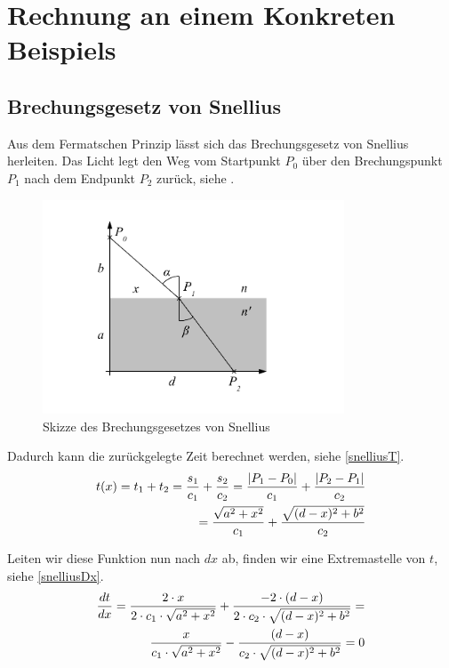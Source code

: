 \section{Rechnung an einem Konkreten Beispiels}

\subsection{Brechungsgesetz von Snellius \label{brechungsgesetz}}
\cite{Wikipedia} Aus dem Fermatschen Prinzip lässt sich das Brechungsgesetz von Snellius herleiten.
Das Licht legt den Weg vom Startpunkt $P_0$ über den Brechungspunkt $P_1$ 
nach dem Endpunkt $P_2$ zurück, siehe .
\begin{figure}[H]
	\includegraphics[width=0.8\textwidth]{./picture/Brechung.pdf}
	\caption{Skizze des Brechungsgesetzes von Snellius}
	\label{Ab:brechung}
\end{figure}

Dadurch kann die zurückgelegte Zeit berechnet werden, siehe \eqref{snelliusT}.
\begin{align}
t(x) = t_1 + t_2 = \frac{s_1}{c_1} + \frac{s_2}{c_2} = \frac{|P_1 - P_0|}{c_1} + \frac{|P_2 - P_1|}{c_2} \notag \\
= \frac{\sqrt{a^2 + x^2}}{c_1} + \frac{\sqrt{(d-x)^2 + b^2}}{c_2} \label{snelliusT}
\end{align}

Leiten wir diese Funktion nun nach $dx$ ab, finden wir eine  Extremastelle von $t$, siehe \eqref{snelliusDx}.
\begin{align}
	\frac{dt}{dx} = \frac{2 \cdot x}{2 \cdot c_1 \cdot \sqrt{a^2 + x^2}} + \frac{-2 \cdot (d-x)}{2 \cdot c_2 \cdot \sqrt{(d-x)^2 + b^2}} = \notag \\
	\frac{x}{c_1 \cdot \sqrt{a^2 + x^2}} - \frac{(d-x)}{c_2 \cdot \sqrt{(d-x)^2 + b^2}} = 0 \label{snelliusDx}
\end{align}

